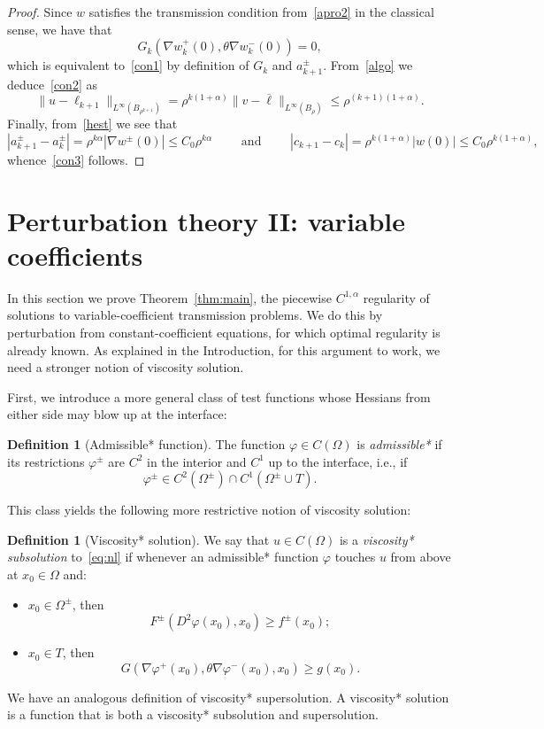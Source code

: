 \documentclass[letter,11pt]{amsart}
\theoremstyle{definition}
\newtheorem{defn}[thm]{Definition}
\numberwithin{equation}{section}
\begin{document}
\begin{proof}
\medskip

Since $w$ satisfies the transmission condition from~\eqref{apro2} in the classical sense, we have that
\[
G_k(\nabla w_{k}^{+}(0), \theta \nabla w_{k}^{-}(0)) = 0,
\]
which is equivalent to~\eqref{con1} by definition of $G_k$ and $a_{k+1}^{\pm}$.
From~\eqref{algo} we deduce~\eqref{con2} as
\[
\|u - \ell_{k+1}\|_{L^{\infty}(B_{\rho^{k+1}})} = \rho^{k(1+\alpha)}\|v - \overline{\ell}\|_{L^{\infty}(B_{\rho})} \leq \rho^{(k+1)(1+\alpha)}.
\]
Finally, from~\eqref{hest} we see that
\[
|a_{k+1}^{\pm} - a_{k}^{\pm}| = \rho^{k \alpha} |\nabla w^{\pm}(0)| \leq C_0 \rho^{k\alpha}
\qquad \text{ and } \qquad |c_{k+1} - c_{k}| = \rho^{k (1+\alpha)} |w(0)| \leq C_0 \rho^{k(1+\alpha)},
\]
whence~\eqref{con3} follows.
\end{proof}

\medskip


\section{Perturbation theory II: variable coefficients}
\label{sec:pert}

In this section we prove Theorem~\ref{thm:main}, the piecewise $C^{1,\alpha}$ regularity of solutions to variable-coefficient transmission problems.
We do this by perturbation from constant-coefficient equations, for which optimal regularity is already known.
As explained in the Introduction, for this argument to work, we need a stronger notion of viscosity solution.

\medskip

First, we introduce a more general class of test functions whose Hessians from either side may blow up at the interface:

\begin{defn}
[Admissible* function]
The function $\varphi \in C(\Omega)$ is 
\emph{admissible*}
if its restrictions $\varphi^{\pm}$ are $C^2$ in the interior and $C^{1}$ up to the interface, i.e., if
\[
\varphi^{\pm} \in C^2(\Omega^{\pm}) \cap C^{1}(\Omega^{\pm} \cup T).
\]
\end{defn}

This class yields the following more restrictive notion of viscosity solution:

\begin{defn}[Viscosity* solution]
\label{def:viscstar}
We say that $u \in C(\Omega)$ is a \emph{viscosity*} \emph{subsolution} to~\eqref{eq:nl} if whenever an admissible* function $\varphi$ touches $u$ from above at $x_0 \in \Omega$ and:
\begin{itemize}
\item $x_0 \in \Omega^{\pm}$, then
\[
F^{\pm}(D^2 \varphi(x_0), x_0) \geq f^{\pm}(x_0);
\]
\item $x_0 \in T$, then
\[
G(\nabla \varphi^{+}(x_0), \theta \nabla \varphi^{-}(x_0), x_0) \geq g(x_0).
\]
\end{itemize}
We have an analogous definition of viscosity* supersolution.
A viscosity* solution is a function that is both a viscosity* subsolution and supersolution.
\end{defn}
\end{document}

